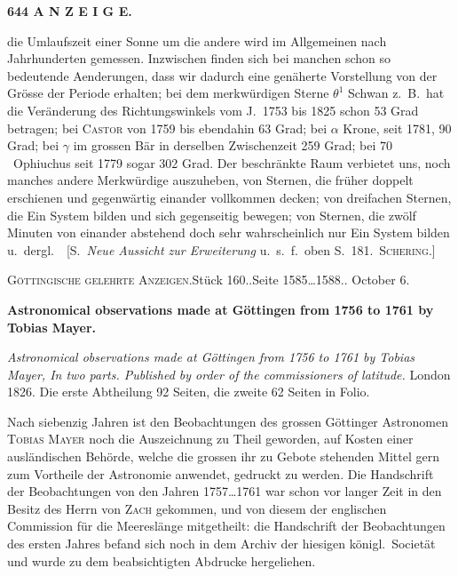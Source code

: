 \documentclass[12pt,a4paper]{article}
\newcommand{\anzeigeheading}[4]{%
    \begin{center}
    \small\textsc{G\"ottingische gelehrte Anzeigen.}\quad St\"uck #1.\quad Seite #2.\quad #3
    \end{center}
    \vspace{-2mm}
    \begin{center}\small\textbf{#4}\end{center}
    \vspace{2mm}
}
\begin{document}
\begin{center}\small\textbf{644 A N Z E I G E.}\end{center}

die Umlaufszeit einer Sonne um die andere wird im Allgemeinen nach Jahrhunderten gemessen. Inzwischen finden sich bei manchen schon so bedeutende Aenderungen, dass wir dadurch eine gen\"aherte Vorstellung von der Gr\"osse der Periode erhalten; bei dem merkw\"urdigen Sterne $\theta^{1}$ Schwan z.\ B.\ hat die Ver\"anderung des Richtungswinkels vom J.\ 1753 bis 1825 schon 53 Grad betragen; bei \textsc{Castor} von 1759 bis ebendahin 63 Grad; bei $\alpha$ Krone, seit 1781, 90 Grad; bei $\gamma$ im grossen B\"ar in derselben Zwischenzeit 259 Grad; bei $70$ \ Ophiuchus seit 1779 sogar 302 Grad. Der beschr\"ankte Raum verbietet uns, noch manches andere Merkw\"urdige auszuheben, von Sternen, die fr\"uher doppelt erschienen und gegenw\"artig einander vollkommen decken; von dreifachen Sternen, die Ein System bilden und sich gegenseitig bewegen; von Sternen, die zw\"olf Minuten von einander abstehend doch sehr wahrscheinlich nur Ein System bilden u.\ dergl.\ \ [S.\ \textit{Neue Aussicht zur Erweiterung} u.\ s.\ f.\ oben S.\ 181.\ \textsc{Schering}.]

\anzeigeheading{160.}{1585\dots 1588.}{1827 October 6.}{Astronomical observations made at G\"ottingen from 1756 to 1761 by Tobias Mayer.}

\begin{otherlanguage}{english}
\noindent\small\textit{Astronomical observations made at G\"ottingen from 1756 to 1761 by Tobias Mayer, In two parts. Published by order of the commissioners of latitude.} London 1826. Die erste Abtheilung 92 Seiten, die zweite 62 Seiten in Folio.
\end{otherlanguage}

\vspace{2mm}

Nach siebenzig Jahren ist den Beobachtungen des grossen G\"ottinger Astronomen \textsc{Tobias Mayer} noch die Auszeichnung zu Theil geworden, auf Kosten einer ausl\"andischen Beh\"orde, welche die grossen ihr zu Gebote stehenden Mittel gern zum Vortheile der Astronomie anwendet, gedruckt zu werden. Die Handschrift der Beobachtungen von den Jahren 1757\dots 1761 war schon vor langer Zeit in den Besitz des Herrn von \textsc{Zach} gekommen, und von diesem der englischen Commission f\"ur die Meeresl\"ange mitgetheilt: die Handschrift der Beobachtungen des ersten Jahres befand sich noch in dem Archiv der hiesigen k\"onigl.\ Societ\"at und wurde zu dem beabsichtigten Abdrucke hergeliehen.
\end{document}
